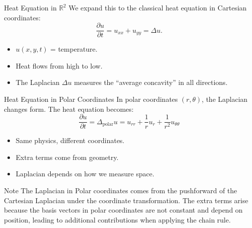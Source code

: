\documentclass[aspectratio=1610,10pt]{beamer}
\begin{document}
  \begin{frame}{Heat Equation in $\mathbb{R}^2$}
    We expand this to the classical heat equation in Cartesian coordinates:
    \[%
      \frac{\partial u}{\partial t} = u_{xx} + u_{yy} = \Delta u
    .\]%
    \begin{itemize}
      \item $u(x,y,t)$ = temperature.
      \item Heat flows from high to low.
      \item The Laplacian $\Delta u$ measures the ``average concavity'' in all directions.
    \end{itemize}
  \end{frame}

  \begin{frame}{Heat Equation in Polar Coordinates}
    In polar coordinates $(r,\theta)$, the Laplacian changes form. The heat equation becomes:
    \[
      \frac{\partial u}{\partial t} = \Delta_{\text{polar}} u = u_{rr} + \frac{1}{r}u_r + \frac{1}{r^2}u_{\theta\theta}
    \]
    \begin{itemize}
      \item Same physics, different coordinates.
      \item Extra terms come from geometry.
      \item Laplacian depends on how we measure space.
    \end{itemize}

    \begin{block}{Note}
      The Laplacian in Polar coordinates comes from the pushforward of the Cartesian Laplacian under the coordinate transformation. The extra terms arise because the basis vectors in polar coordinates are not constant and depend on position, leading to additional contributions when applying the chain rule.
    \end{block}
  \end{frame}
\end{document}
